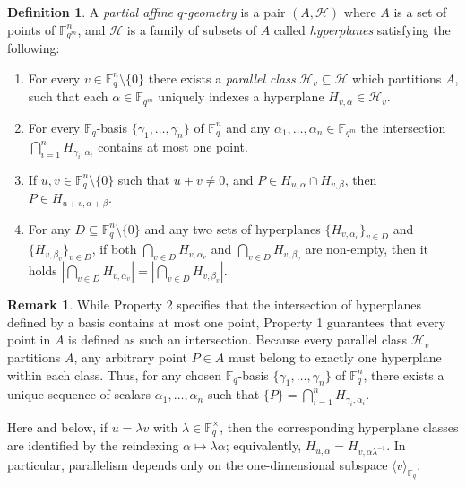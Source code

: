 \documentclass[a4paper,11pt,reqno]{article}
\newcommand{\F}{\mathbb{F}}
\theoremstyle{plain} \numberwithin{equation}{section}
\theoremstyle{definition}
\newtheorem{definition}[theorem]{Definition}
\newtheorem{remark}[theorem]{Remark}
\begin{document}
\begin{definition} \label{def:partialgeometry}
A \emph{partial affine $q$-geometry} is a pair $(A,\mathcal{H})$ where $A$ is a set of points of $\F_{q^m}^n$, and $\mathcal{H}$ is a family of subsets of $A$ called \emph{hyperplanes} satisfying the following:
\begin{enumerate}
    \item For every $v\in \F_q^n \setminus\{0\}$ there exists a \emph{parallel class} $\mathcal{H}_v\subseteq \mathcal{H}$ which partitions $A$, such that each $\alpha\in \F_{q^m}$ uniquely indexes a hyperplane $H_{v,\alpha}\in \mathcal{H}_v$.
    \item For every $\F_q$-basis $\{\gamma_1,\ldots,\gamma_n\}$ of $\F_q^n$ and any $\alpha_1,\ldots,\alpha_n\in \F_{q^m}$ the intersection $\bigcap_{i=1}^n H_{\gamma_i,\alpha_i}$ contains at most one point.
    \item If $u,v\in \F_q^n\setminus\{0\}$ such that $u+v\neq 0$, and $P\in H_{u,\alpha}\cap H_{v,\beta}$, then $P\in H_{u+v,\alpha+\beta}$.
    \item For any $D\subseteq \F_q^n\setminus\{0\}$ and any two sets of hyperplanes $\{H_{v,\alpha_v}\}_{v \in D}$ and $\{ H_{v,\beta_v}\}_{v\in D}$, if both $\bigcap_{v\in D} H_{v,\alpha_v}$ and $\bigcap_{v\in D} H_{v,\beta_v}$ are non-empty, then it holds $|\bigcap_{v\in D} H_{v,\alpha_v}| = |\bigcap_{v\in D} H_{v,\beta_v}|$.
\end{enumerate}
\end{definition}

\begin{remark}
    While Property 2 specifies that the intersection of hyperplanes defined by a basis contains at most one point, Property 1 guarantees that every point in $A$ is defined as such an intersection. Because every parallel class $\mathcal{H}_v$ partitions $A$, any arbitrary point $P \in A$ must belong to exactly one hyperplane within each class. Thus, for any chosen $\F_q$-basis $\{\gamma_1, \ldots, \gamma_n\}$ of $\F_q^n$, there exists a unique sequence of scalars $\alpha_1, \ldots, \alpha_n$ such that $\{P\} = \bigcap_{i=1}^n H_{\gamma_i, \alpha_i}$.
\end{remark}

Here and below, if $u=\lambda v$ with $\lambda \in \F_q^\times$, then the corresponding hyperplane classes are identified by the reindexing $\alpha\mapsto \lambda \alpha$; equivalently, $H_{u,\alpha} = H_{v,\alpha \lambda^{-1}}$. In particular, parallelism depends only on the one-dimensional subspace $\langle v\rangle_{\F_q}$.
\end{document}
